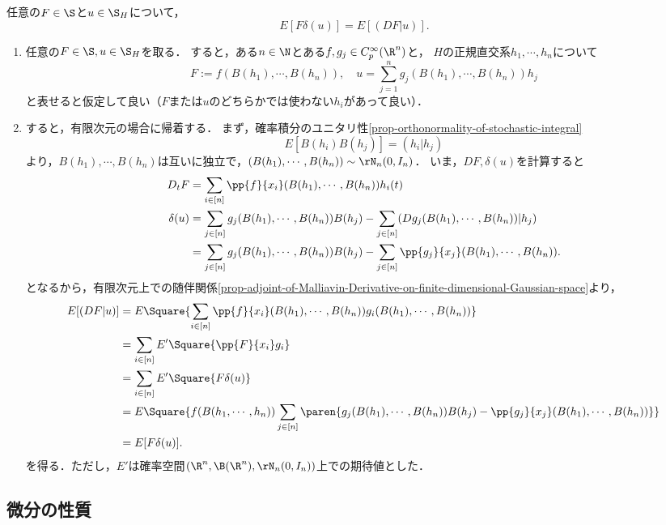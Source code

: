 \documentclass[uplatex,dvipdfmx]{jsreport}
\begin{document}
\begin{proposition}
    任意の$F\in\S$と$u\in\S_H$について，
    \[E[F\delta(u)]=E[(DF|u)].\]
\end{proposition}
\begin{Proof}\mbox{}
    \begin{enumerate}[{Step}1]
        \item 任意の$F\in\S,u\in\S_H$を取る．
        すると，ある$n\in\N$とある$f,g_j\in C_p^\infty(\R^n)$と，
        $H$の正規直交系$h_1,\cdots,h_n$について
        \[F:=f(B(h_1),\cdots,B(h_n)),\quad u=\sum_{j=1}^ng_j(B(h_1),\cdots,B(h_n))h_j\]
        と表せると仮定して良い（$F$または$u$のどちらかでは使わない$h_i$があって良い）．
        \item すると，有限次元の場合に帰着する．
        まず，確率積分のユニタリ性\ref{prop-orthonormality-of-stochastic-integral}
        \[E[B(h_i)B(h_j)]=(h_i|h_j)\]
        より，$B(h_1),\cdots,B(h_n)$は互いに独立で，$(B(h_1),\cdots,B(h_n))\sim\rN_n(0,I_n)$．
        いま，$DF,\delta(u)$を計算すると
        \begin{align*}
            D_tF&=\sum_{i\in[n]}\pp{f}{x_i}(B(h_1),\cdots,B(h_n))h_i(t)\\
            \delta(u)&=\sum_{j\in[n]}g_j(B(h_1),\cdots,B(h_n))B(h_j)-\sum_{j\in[n]}(Dg_j(B(h_1),\cdots,B(h_n))|h_j)\\
            &=\sum_{j\in[n]}g_j(B(h_1),\cdots,B(h_n))B(h_j)-\sum_{j\in[n]}\pp{g_j}{x_j}(B(h_1),\cdots,B(h_n)).
        \end{align*}
        となるから，有限次元上での随伴関係\ref{prop-adjoint-of-Malliavin-Derivative-on-finite-dimensional-Gaussian-space}より，
        \begin{align*}
            E[(DF|u)]&=E\Square{\sum_{i\in[n]}\pp{f}{x_i}(B(h_1),\cdots,B(h_n))g_i(B(h_1),\cdots,B(h_n))}\\
            &=\sum_{i\in[n]}E'\Square{\pp{F}{x_i}g_i}\\
            &=\sum_{i\in[n]}E'\Square{F\delta(u)}\\
            &=E\Square{f(B(h_1,\cdots,h_n))\sum_{j\in[n]}\paren{g_j(B(h_1),\cdots,B(h_n))B(h_j)-\pp{g_j}{x_j}(B(h_1),\cdots,B(h_n))}}\\
            &=E[F\delta(u)].
        \end{align*}
        を得る．ただし，$E'$は確率空間$(\R^n,\B(\R^n),\rN_n(0,I_n))$上での期待値とした．
    \end{enumerate}
\end{Proof}

\subsection{微分の性質}
\end{document}
